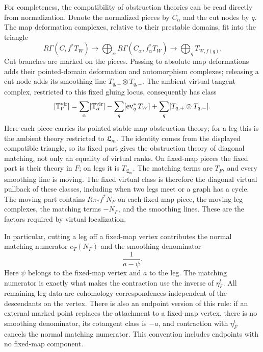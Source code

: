 For completeness, the compatibility of obstruction theories can be
read directly from normalization. Denote the normalized pieces by
$C_\alpha$ and the cut nodes by $q$. The map deformation complexes,
relative to their prestable domains, fit into the triangle
\[
 R\Gamma(C,f^*T_W)\longrightarrow
 \bigoplus_\alpha R\Gamma(C_\alpha,f_\alpha^*T_W)
 \longrightarrow\bigoplus_q T_{W,f(q)}.
\]
Cut branches are marked on the pieces. Passing to absolute map
deformations adds their pointed-domain deformation and automorphism
complexes; releasing a cut node adds its smoothing line
$T_{q,+}\otimes T_{q,-}$. The ambient virtual tangent complex,
restricted to this fixed gluing locus, consequently has class
\begin{equation}\label{loc:tangent-gluing}
 [\mathbb T^{\mathrm{vir}}_\Gamma]
 =\sum_\alpha[\mathbb T^{\mathrm{vir}}_\alpha]
  -\sum_q[\operatorname{ev}_q^*T_W]
  +\sum_q[T_{q,+}\otimes T_{q,-}].
\end{equation}
Here each piece carries its pointed stable-map obstruction theory;
for a leg this is the ambient theory restricted to $\mathfrak L_m$.
The identity comes from the displayed compatible triangle, so its
fixed part gives the obstruction theory of diagonal matching, not
only an equality of virtual ranks. On fixed-map pieces the fixed
part is their theory in $F$; on legs it is $T_{\mathfrak L_m}$.
The matching terms are $T_F$, and every smoothing line is moving.
The fixed virtual class is therefore the diagonal virtual pullback
of these classes, including when two legs meet or a graph has a cycle.
The moving part contains $R\pi_*f^*N_F$ on each fixed-map piece,
the moving leg complexes, the matching terms $-N_F$, and the
smoothing lines. These are the factors required by virtual localization.

In particular, cutting a leg off a fixed-map vertex contributes the
normal matching numerator $e_T(N_F)$ and the smoothing denominator
\begin{equation}\label{loc:flag-denominator}
                  \frac1{a-\psi}.
\end{equation}
Here $\psi$ belongs to the fixed-map vertex and $a$ to the leg.
The matching numerator is exactly what makes the contraction use the
inverse of $\eta_F^t$. All remaining leg data are cohomology
correspondences independent of the descendants on the vertex.
There is also an endpoint version of this rule: if an external marked
point replaces the attachment to a fixed-map vertex, there is no
smoothing denominator, its cotangent class is $-a$, and contraction
with $\eta_F^t$ cancels the normal matching numerator. This convention
includes endpoints with no fixed-map component.

